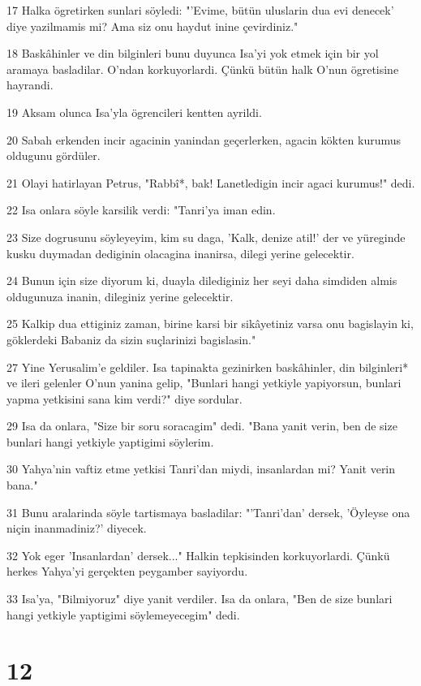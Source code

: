 \par 17 Halka ögretirken sunlari söyledi: "'Evime, bütün uluslarin dua evi denecek' diye yazilmamis mi? Ama siz onu haydut inine çevirdiniz."
\par 18 Baskâhinler ve din bilginleri bunu duyunca Isa'yi yok etmek için bir yol aramaya basladilar. O'ndan korkuyorlardi. Çünkü bütün halk O'nun ögretisine hayrandi.
\par 19 Aksam olunca Isa'yla ögrencileri kentten ayrildi.
\par 20 Sabah erkenden incir agacinin yanindan geçerlerken, agacin kökten kurumus oldugunu gördüler.
\par 21 Olayi hatirlayan Petrus, "Rabbî*, bak! Lanetledigin incir agaci kurumus!" dedi.
\par 22 Isa onlara söyle karsilik verdi: "Tanri'ya iman edin.
\par 23 Size dogrusunu söyleyeyim, kim su daga, 'Kalk, denize atil!' der ve yüreginde kusku duymadan dediginin olacagina inanirsa, dilegi yerine gelecektir.
\par 24 Bunun için size diyorum ki, duayla dilediginiz her seyi daha simdiden almis oldugunuza inanin, dileginiz yerine gelecektir.
\par 25 Kalkip dua ettiginiz zaman, birine karsi bir sikâyetiniz varsa onu bagislayin ki, göklerdeki Babaniz da sizin suçlarinizi bagislasin."
\par 27 Yine Yerusalim'e geldiler. Isa tapinakta gezinirken baskâhinler, din bilginleri* ve ileri gelenler O'nun yanina gelip, "Bunlari hangi yetkiyle yapiyorsun, bunlari yapma yetkisini sana kim verdi?" diye sordular.
\par 29 Isa da onlara, "Size bir soru soracagim" dedi. "Bana yanit verin, ben de size bunlari hangi yetkiyle yaptigimi söylerim.
\par 30 Yahya'nin vaftiz etme yetkisi Tanri'dan miydi, insanlardan mi? Yanit verin bana."
\par 31 Bunu aralarinda söyle tartismaya basladilar: "'Tanri'dan' dersek, 'Öyleyse ona niçin inanmadiniz?' diyecek.
\par 32 Yok eger 'Insanlardan' dersek..." Halkin tepkisinden korkuyorlardi. Çünkü herkes Yahya'yi gerçekten peygamber sayiyordu.
\par 33 Isa'ya, "Bilmiyoruz" diye yanit verdiler. Isa da onlara, "Ben de size bunlari hangi yetkiyle yaptigimi söylemeyecegim" dedi.

\chapter{12}

